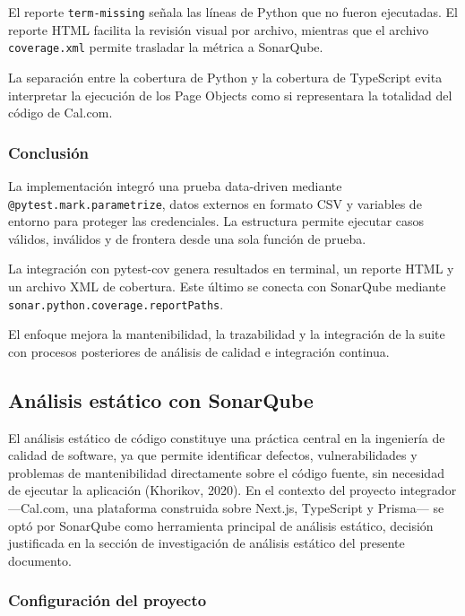 \documentclass{article}
\begin{document}
El reporte \texttt{term-missing} señala las líneas de Python que no fueron ejecutadas. El reporte HTML facilita la revisión visual por archivo, mientras que el archivo \texttt{coverage.xml} permite trasladar la métrica a SonarQube.

La separación entre la cobertura de Python y la cobertura de TypeScript evita interpretar la ejecución de los Page Objects como si representara la totalidad del código de Cal.com.

\subsubsection{Conclusión}

La implementación integró una prueba data-driven mediante \texttt{@pytest.mark.parametrize}, datos externos en formato CSV y variables de entorno para proteger las credenciales. La estructura permite ejecutar casos válidos, inválidos y de frontera desde una sola función de prueba.

La integración con pytest-cov genera resultados en terminal, un reporte HTML y un archivo XML de cobertura. Este último se conecta con SonarQube mediante \texttt{sonar.python.coverage.reportPaths}.

El enfoque mejora la mantenibilidad, la trazabilidad y la integración de la suite con procesos posteriores de análisis de calidad e integración continua.


\subsection{Análisis estático con SonarQube}

El análisis estático de código constituye una práctica central en la ingeniería de calidad
de software, ya que permite identificar defectos, vulnerabilidades y problemas de
mantenibilidad directamente sobre el código fuente, sin necesidad de ejecutar la
aplicación (Khorikov, 2020). En el contexto del proyecto integrador ---Cal.com, una
plataforma construida sobre Next.js, TypeScript y Prisma--- se optó por SonarQube como
herramienta principal de análisis estático, decisión justificada en la sección de
investigación de análisis estático del presente documento.

\subsubsection{Configuración del proyecto}
\end{document}
